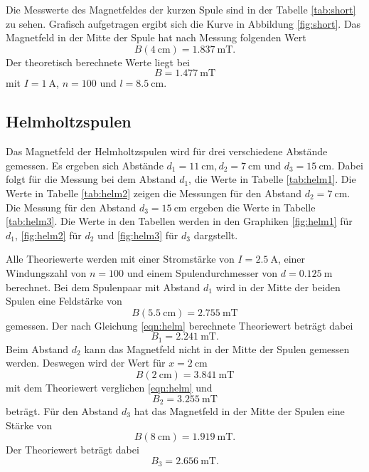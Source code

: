 Die Messwerte des Magnetfeldes der kurzen Spule sind in der Tabelle \ref{tab:short} zu sehen.
Grafisch aufgetragen ergibt sich die Kurve in Abbildung \ref{fig:short}.
Das Magnetfeld in der Mitte der Spule hat nach Messung folgenden Wert
\begin{equation*}
  B(\SI{4}{\centi\meter})=\SI{1.837}{\milli\tesla} .
\end{equation*}
Der theoretisch berechnete Werte liegt bei
\begin{equation*}
  B = \SI{1.477}{\milli\tesla}
\end{equation*}
mit $I=\SI{1}{\ampere}$, $n=100$ und $l=\SI{8.5}{\centi\meter}$.
\FloatBarrier

\subsection{Helmholtzspulen}

Das Magnetfeld der Helmholtzspulen wird für drei verschiedene Abstände gemessen.
Es ergeben sich Abstände $d_1=\SI{11}{\centi\metre}, d_2=\SI{7}{\centi\metre}$ und $d_3=\SI{15}{\centi\metre}$.
Dabei folgt für die Messung bei dem Abstand $d_1$, die Werte in Tabelle \ref{tab:helm1}.
Die Werte in Tabelle \ref{tab:helm2} zeigen die Messungen für den Abstand $d_2=\SI{7}{\centi\metre}$.
Die Messung für den Abstand $d_3=\SI{15}{\centi\metre}$ ergeben die Werte in Tabelle \ref{tab:helm3}.
Die Werte in den Tabellen werden in den Graphiken \ref{fig:helm1} für $d_1$, \ref{fig:helm2} für $d_2$ und \ref{fig:helm3} für $d_3$ dargstellt.

Alle Theoriewerte werden mit einer Stromstärke von $I=\SI{2.5}{\ampere}$, einer Windungszahl von $n=100$ und einem Spulendurchmesser von $d=\SI{0.125}{\meter}$ berechnet.
Bei dem Spulenpaar mit Abstand $d_1$ wird in der Mitte der beiden Spulen eine Feldstärke von 
\begin{equation*}
  B(\SI{5.5}{\centi\meter}) =\SI{2.755}{\milli\tesla}
\end{equation*}
gemessen.
Der nach Gleichung \eqref{eqn:helm} berechnete Theoriewert beträgt dabei
\begin{equation*}
  B_1=\SI{2.241}{\milli\tesla} .
\end{equation*}
Beim Abstand $d_2$ kann das Magnetfeld nicht in der Mitte der Spulen gemessen werden.
Deswegen wird der Wert für $x=\SI{2}{\centi\meter}$
\begin{equation*}
  B(\SI{2}{\centi\meter})=\SI{3.841}{\milli\tesla}
\end{equation*}
mit dem Theoriewert verglichen \eqref{eqn:helm} und 
\begin{equation*}
  B_2 =\SI{3.255}{\milli\tesla}
\end{equation*}
beträgt.
Für den Abstand $d_3$ hat das Magnetfeld in der Mitte der Spulen eine Stärke von 
\begin{equation*}
  B(\SI{8}{\centi\meter})=\SI{1.919}{\milli\tesla} .
\end{equation*}
Der Theoriewert beträgt dabei 
\begin{equation*}
  B_3=\SI{2.656}{\milli\tesla}.
\end{equation*}

